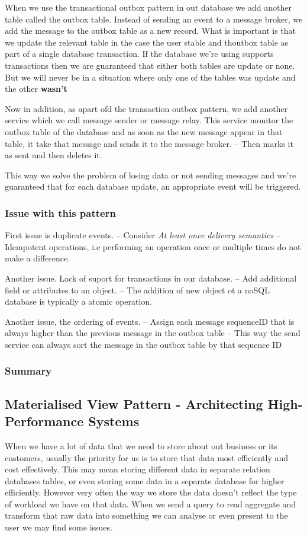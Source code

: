 \documentclass[a4paper, 11pt]{book}
\begin{document}
    When we use the transactional outbox pattern in out database we add another table called the outbox table.
    Instead of sending an event to a message broker, we add the message to the outbox table as a new record.
    What is important is that we update the relevant table in the case the user stable and thoutbox table as part of a single database transaction.
    If the database we're using supports transactions then we are guaranteed that either both tables are update or none.
    But we will never be in a situation where only one of the tables was update and the other \textbf{wasn't}

    Now in addition, as apart ofd the transaction outbox pattern, we add another service which we call message sender or message relay.
    This service monitor the outbox table of the database and as soon as the new message appear in that table, it take that message and sends it to the message broker.
    -- Then marks it as sent and then deletes it.

    This way we solve the problem of losing data or not sending messages and we're guaranteed that for each database update, an appropriate event will be triggered.

    \subsubsection{Issue with this pattern}
    First issue is duplicate events.
    -- Consider \textit{At least once delivery semantics}
    -- Idempotent operations, i.e performing an operation once or multiple times do not make a difference.

    Another issue. Lack of suport for transactions in our database.
    -- Add additional field or attributes to an object.
    -- The addition of new object ot a noSQL database is typically a atomic operation.

    Another issue, the ordering of events.
    -- Assign each message sequenceID that is always higher than the previous message in the outbox table
    -- This way the send service can always sort the message in the outbox table by that sequence ID

    \subsubsection{Summary}

    \subsection{Materialised View Pattern - Architecting High-Performance Systems}
    When we have a lot of data that we need to store about out business or its customers, usually the priority for us is to store that data most efficiently and cost effectively.
    This may mean storing different data in separate relation databases tables, or even storing some data in a separate database for higher efficiently.
    However very often the way we store the data doesn't reflect the type of workload we have on that data.
    When we send a query to read aggregate and transform that raw data into something we can analyse or even present to the user we may find some issues.
\end{document}
